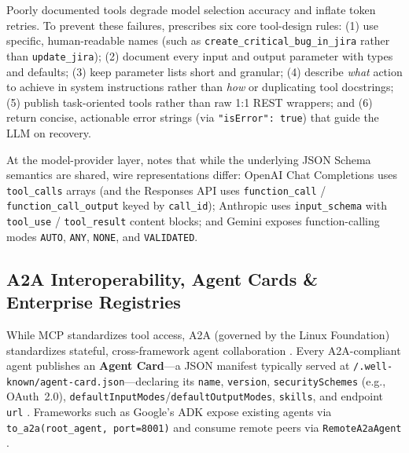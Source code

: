 \documentclass[../../../../master.tex]{subfiles}
\begin{document}
Poorly documented tools degrade model selection accuracy and inflate token retries. To prevent these failures,  prescribes six core tool-design rules: (1) use specific, human-readable names (such as \texttt{create\_critical\_bug\_in\_jira} rather than \texttt{update\_jira}); (2) document every input and output parameter with types and defaults; (3) keep parameter lists short and granular; (4) describe \emph{what} action to achieve in system instructions rather than \emph{how} or duplicating tool docstrings; (5) publish task-oriented tools rather than raw 1:1 REST wrappers; and (6) return concise, actionable error strings (via \texttt{"isError": true}) that guide the LLM on recovery.

At the model-provider layer,  notes that while the underlying JSON Schema semantics are shared, wire representations differ: OpenAI Chat Completions uses \texttt{tool\_calls} arrays (and the Responses API uses \texttt{function\_call} / \texttt{function\_call\_output} keyed by \texttt{call\_id}); Anthropic uses \texttt{input\_schema} with \texttt{tool\_use} / \texttt{tool\_result} content blocks; and Gemini exposes function-calling modes \texttt{AUTO}, \texttt{ANY}, \texttt{NONE}, and \texttt{VALIDATED}.

\subsection{A2A Interoperability, Agent Cards \& Enterprise Registries}

While MCP standardizes tool access, A2A (governed by the Linux Foundation) standardizes stateful, cross-framework agent collaboration . Every A2A-compliant agent publishes an \textbf{Agent Card}---a JSON manifest typically served at \texttt{/.well-known/agent-card.json}---declaring its \texttt{name}, \texttt{version}, \texttt{securitySchemes} (e.g., OAuth~2.0), \texttt{defaultInputModes}/\texttt{defaultOutputModes}, \texttt{skills}, and endpoint \texttt{url} . Frameworks such as Google's ADK expose existing agents via \texttt{to\_a2a(root\_agent, port=8001)} and consume remote peers via \texttt{RemoteA2aAgent} .
\end{document}
